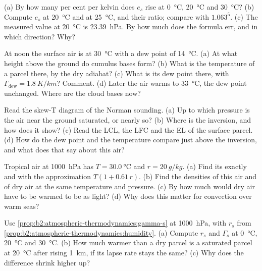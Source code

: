 \begin{exercise}[$\star$]\label{exo:b2:atmospheric-thermodynamics:2}
(a) By how many per cent per kelvin does $e_s$ rise at \qty{0}{\celsius}, \qty{20}{\celsius} and
\qty{30}{\celsius}? (b) Compute $e_s$ at \qty{20}{\celsius} and at \qty{25}{\celsius}, and their
ratio; compare with $1.063^5$. (c) The measured value at \qty{20}{\celsius} is
\qty{23.39}{hPa}. By how much does the formula err, and in which direction? Why?
\end{exercise}

\begin{exercise}[$\star$]\label{exo:b2:atmospheric-thermodynamics:3}
At noon the surface air is at \qty{30}{\celsius} with a dew point of \qty{14}{\celsius}. (a) At
what height above the ground do cumulus bases form? (b) What is the temperature of a parcel
there, by the dry adiabat? (c) What is its dew point there, with $\Gamma_{\text{dew}} =
\qty{1.8}{K/km}$? Comment. (d) Later the air warms to \qty{33}{\celsius}, the dew point
unchanged. Where are the cloud bases now?
\end{exercise}

\begin{exercise}[$\star$]\label{exo:b2:atmospheric-thermodynamics:4}
Read the skew-T diagram of the Norman sounding. (a) Up to which pressure is the air near the
ground saturated, or nearly so? (b) Where is the inversion, and how does it show? (c) Read the
LCL, the LFC and the EL of the surface parcel. (d) How do the dew point and the temperature
compare just above the inversion, and what does that say about this air?
\end{exercise}

\begin{exercise}[$\star\star$]\label{exo:b2:atmospheric-thermodynamics:5}
Tropical air at \qty{1000}{hPa} has $T = \qty{30.0}{\celsius}$ and $r = \qty{20}{g/kg}$. (a) Find
its  exactly and with the approximation $T(1 + 0.61\,r)$. (b) Find the densities
of this air and of dry air at the same temperature and pressure. (c) By how much would dry air
have to be warmed to be as light? (d) Why does this matter for convection over warm seas?
\end{exercise}

\begin{exercise}[$\star\star$]\label{exo:b2:atmospheric-thermodynamics:6}
Use \cref{prop:b2:atmospheric-thermodynamics:gamma-s} at \qty{1000}{hPa}, with $r_s$ from
\cref{prop:b2:atmospheric-thermodynamics:humidity}. (a) Compute $r_s$ and $\Gamma_s$ at
\qty{0}{\celsius}, \qty{20}{\celsius} and \qty{30}{\celsius}. (b) How much warmer than a dry
parcel is a saturated parcel at \qty{20}{\celsius} after rising \qty{1}{km}, if its lapse rate
stays the same? (c) Why does the difference shrink higher up?
\end{exercise}

